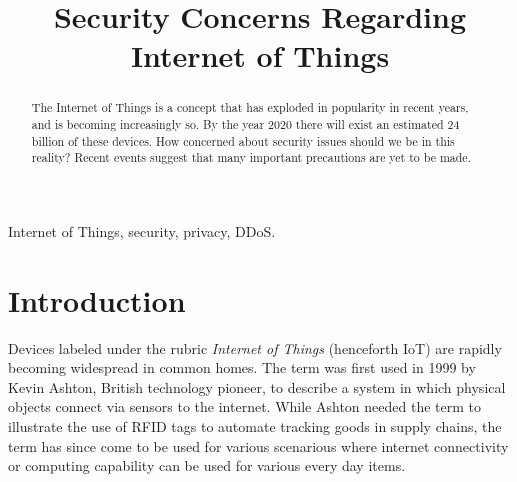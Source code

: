 \documentclass[a4paper, conference]{IEEEtran/IEEEtran}
\begin{document}
%
\title{Security Concerns Regarding Internet of Things}

\author{
}

\maketitle

\begin{abstract}
The Internet of Things is a concept that has exploded in popularity in recent years, and is becoming increasingly so. By the year 2020 there will exist an estimated 24 billion of these devices.\cite{meola} How concerned about security issues should we be in this reality? Recent events suggest that many important precautions are yet to be made.
\end{abstract}

\begin{IEEEkeywords}
Internet of Things, security, privacy, DDoS.
\end{IEEEkeywords}

%
\IEEEpeerreviewmaketitle

\section{Introduction}
Devices labeled under the rubric \textit{Internet of Things} (henceforth IoT) are rapidly becoming widespread in common homes.\cite{mulani} The term was first used in 1999 by Kevin Ashton, British technology pioneer, to describe a system in which physical objects connect via sensors to the internet. While Ashton needed the term to illustrate the use of RFID tags to automate tracking goods in supply chains, the term has since come to be used for various scenarious where internet connectivity or computing capability can be used for various every day items. 
\end{document}
